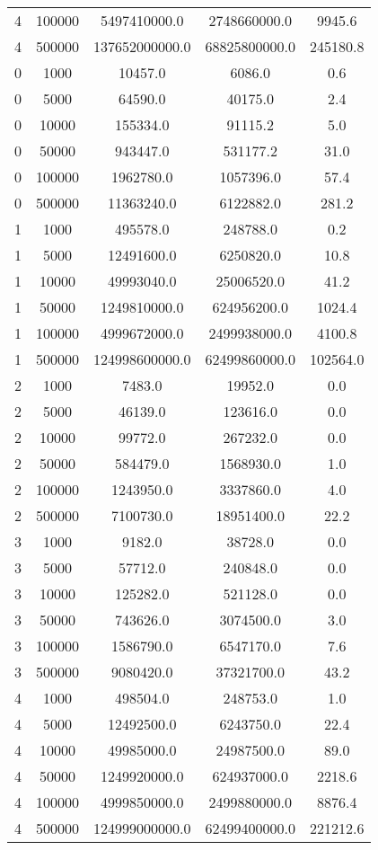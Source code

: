 \begin{table}[htbp]
\begin{tabular}{c|c|c|c|c}
4 & 100000 & 5497410000.0 & 2748660000.0 & 9945.6\\
4 & 500000 & 137652000000.0 & 68825800000.0 & 245180.8\\
0 & 1000 & 10457.0 & 6086.0 & 0.6\\
0 & 5000 & 64590.0 & 40175.0 & 2.4\\
0 & 10000 & 155334.0 & 91115.2 & 5.0\\
0 & 50000 & 943447.0 & 531177.2 & 31.0\\
0 & 100000 & 1962780.0 & 1057396.0 & 57.4\\
0 & 500000 & 11363240.0 & 6122882.0 & 281.2\\
1 & 1000 & 495578.0 & 248788.0 & 0.2\\
1 & 5000 & 12491600.0 & 6250820.0 & 10.8\\
1 & 10000 & 49993040.0 & 25006520.0 & 41.2\\
1 & 50000 & 1249810000.0 & 624956200.0 & 1024.4\\
1 & 100000 & 4999672000.0 & 2499938000.0 & 4100.8\\
1 & 500000 & 124998600000.0 & 62499860000.0 & 102564.0\\
2 & 1000 & 7483.0 & 19952.0 & 0.0\\
2 & 5000 & 46139.0 & 123616.0 & 0.0\\
2 & 10000 & 99772.0 & 267232.0 & 0.0\\
2 & 50000 & 584479.0 & 1568930.0 & 1.0\\
2 & 100000 & 1243950.0 & 3337860.0 & 4.0\\
2 & 500000 & 7100730.0 & 18951400.0 & 22.2\\
3 & 1000 & 9182.0 & 38728.0 & 0.0\\
3 & 5000 & 57712.0 & 240848.0 & 0.0\\
3 & 10000 & 125282.0 & 521128.0 & 0.0\\
3 & 50000 & 743626.0 & 3074500.0 & 3.0\\
3 & 100000 & 1586790.0 & 6547170.0 & 7.6\\
3 & 500000 & 9080420.0 & 37321700.0 & 43.2\\
4 & 1000 & 498504.0 & 248753.0 & 1.0\\
4 & 5000 & 12492500.0 & 6243750.0 & 22.4\\
4 & 10000 & 49985000.0 & 24987500.0 & 89.0\\
4 & 50000 & 1249920000.0 & 624937000.0 & 2218.6\\
4 & 100000 & 4999850000.0 & 2499880000.0 & 8876.4\\
4 & 500000 & 124999000000.0 & 62499400000.0 & 221212.6\\
\end{tabular}
\end{table}
